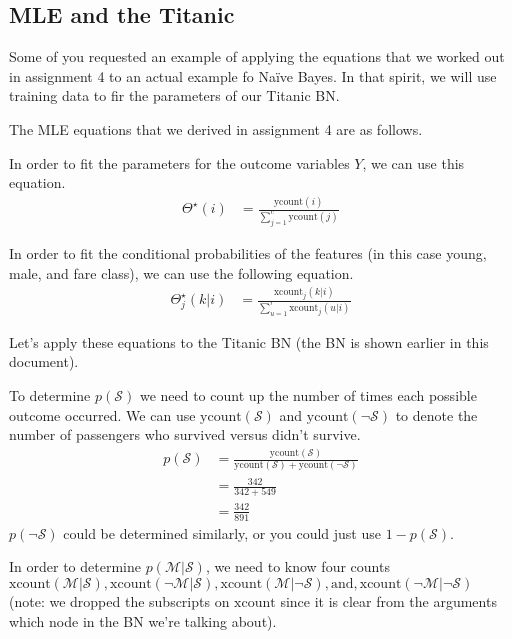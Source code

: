 \documentclass{tufte-handout}
\begin{document}
\subsection{MLE and the Titanic}

Some of you requested an example of applying the equations that we worked out in assignment 4 to an actual example fo Na\"ive Bayes.  In that spirit, we will use training data to fir the parameters of our Titanic BN.


The MLE equations that we derived in assignment 4 are as follows.

\bi
\item In order to fit the parameters for the outcome variables $Y$, we can use this equation.
\begin{align}
\Theta^\star(i) &= \frac{\mbox{ycount}(i)}{\sum_{j=1}^c \mbox{ycount}(j)}
\end{align}
\item  In order to fit the conditional probabilities of the features (in this case young, male, and fare class), we can use the following equation.
\begin{align}
\Theta_j^\star(k|i) &= \frac{\mbox{xcount}_j(k|i)}{\sum_{u=1}^r \mbox{xcount}_j(u|i)}
\end{align}
\ei

Let's apply these equations to the Titanic BN (the BN is shown earlier in this document).

\bi
\item To determine $p(\mathcal{S})$ we need to count up the number of times each possible outcome occurred.  We can use $\mbox{ycount}(\mathcal{S})$ and  $\mbox{ycount}(\neg \mathcal{S})$ to denote the number of passengers who survived versus didn't survive.
\begin{align}
p(\mathcal{S}) &= \frac{\mbox{ycount}(\mathcal{S})}{\mbox{ycount}(\mathcal{S}) + \mbox{ycount}(\neg \mathcal{S})} \nonumber \\
&= \frac{342}{342+549} \nonumber \\
&= \frac{342}{891} \nonumber
\end{align}
$p(\neg \mathcal{S})$ could be determined similarly, or you could just use $1-p(\mathcal{S})$.

\item In order to determine $p(\mathcal{M} | \mathcal{S})$, we need to know four counts $\mbox{xcount}(\mathcal{M}| \mathcal{S}), \mbox{xcount}(\neg \mathcal{M}| \mathcal{S}), \mbox{xcount}(\mathcal{M}|\neg \mathcal{S}), \mbox{and}, \mbox{xcount}(\neg \mathcal{M}|\neg \mathcal{S})$ (note: we dropped the subscripts on $\mbox{xcount}$ since it is clear from the arguments which node in the BN we're talking about).
\end{document}
